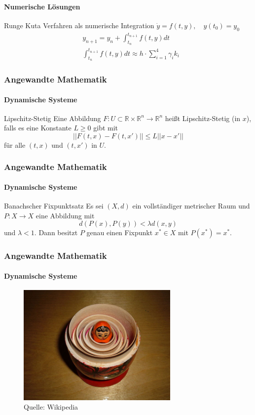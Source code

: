 \documentclass{beamer}
\begin{document}
 \begin{frame}
\framesubtitle{Numerische Lösungen}
    \begin{block}{Runge Kuta Verfahren als numerische Integration}
$\dot{y}=f(t,y), \quad  y(t_0)=y_0$
\begin{align}
& y_{n+1} = y_n + \int_{t_n}^{t_{n+1}} f(t, y) dt \\
&  \int_{t_n}^{t_{n+1}} f(t, y) dt \approx h \cdot \sum_{i=1}^4 \gamma_i k_i
\end{align}
    \end{block}
\end{frame}





\begin{frame}
    \frametitle{Angewandte Mathematik}
\framesubtitle{Dynamische Systeme }
\begin{block}{Lipschitz-Stetig}
Eine  Abbildung $F : U \subset \mathbb{R} \times \mathbb{R}^n \to \mathbb{R}^n$ heißt Lipschitz-Stetig (in $x$),
falls es eine Konstante $L \geq 0$ gibt  mit
$$ || F(t,x) - F(t,x') ||  \leq L || x -x' ||  $$
für alle $(t,x)$ und $(t,x')$ in $U$.
\end{block}

 \end{frame}

 \begin{frame}
    \frametitle{Angewandte Mathematik}
\framesubtitle{Dynamische Systeme }
\begin{block}{Banachscher Fixpunktsatz}
Es sei $(X,d)$ ein vollständiger metrischer Raum und $P: X \to X$ eine Abbildung mit $$d(P(x), P(y)) < \lambda d(x,y)$$ und $\lambda < 1$. Dann besitzt $P$ genau einen Fixpunkt $x^* \in X$ mit $P(x^*) = x^*$.

\end{block}

 \end{frame}

\begin{frame}
    \frametitle{Angewandte Mathematik}
\framesubtitle{Dynamische Systeme }
\begin{figure}[H]
      \centering
    \includegraphics[width=0.7\textwidth]{images/640px-Floral_matryoshka_set_2_smallest_doll_nested.JPG}
\caption{Quelle: Wikipedia}
\end{figure}

 \end{frame}
\end{document}
